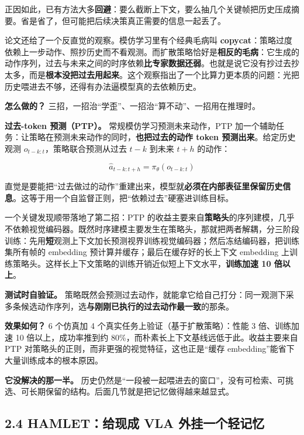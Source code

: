 \documentclass[
  chinese,
]{ctexart}
\begin{document}
正因如此，已有方法大多\textbf{回避}：要么截断上下文，要么抽几个关键帧把历史压成摘要。省是省了，但可能把后续决策真正需要的信息一起丢了。

论文还给了一个反直觉的观察。模仿学习里有个经典毛病叫
\textbf{copycat}：策略过度依赖上一步动作、照抄历史而不看观测。而扩散策略恰好是\textbf{相反的毛病}：它生成的动作序列，过去与未来之间的时序依赖\textbf{比专家数据还弱}。也就是说它没有抄过去抄太多，而是\textbf{根本没把过去用起来}。这个观察指出了一个比算力更本质的问题：光把历史喂进去不够，还得有办法逼模型真的去依赖历史。

\textbf{怎么做的？}
三招，一招治``学歪''、一招治``算不动''、一招用在推理时。

\textbf{过去-token 预测（PTP）。} 常规模仿学习预测未来动作，PTP
加一个辅助任务：让策略在预测未来动作的同时，\textbf{也把过去的动作 token
预测出来}。给定历史观测 \(o_{t-k:t}\)，策略联合预测从过去 \(t-k\) 到未来
\(t+h\) 的动作：

\[\hat{a}_{t-k:t+h} = \pi_\theta(o_{t-k:t})\]

直觉是要能把``过去做过的动作''重建出来，模型就\textbf{必须在内部表征里保留历史信息}。这等于用一个自监督正则，把``依赖过去''硬塞进训练目标。

一个关键发现顺带落地了第二招：PTP
的收益主要来自\textbf{策略头}的序列建模，几乎不依赖视觉编码器。既然时序建模主要发生在策略头，那就把两者解耦，分三阶段训练：先用\textbf{短}观测上下文加长预测视界训练视觉编码器；然后冻结编码器，把训练集所有帧的
embedding 预计算并缓存；最后在缓存好的长上下文 embedding
上训练策略头。这样长上下文策略的训练开销近似短上下文水平，\textbf{训练加速
10 倍以上}。

\textbf{测试时自验证。}
策略既然会预测过去动作，就能拿它给自己打分：同一观测下采多条候选动作序列，选\textbf{与刚刚已执行的过去动作最一致}的那条。

\textbf{效果如何？} 6 个仿真加 4 个真实任务上验证（基于扩散策略）：性能
3 倍、训练加速 10 倍以上，成功率推到约
80\%，而朴素长上下文基线远低于此。收益主要来自 PTP
对策略头的正则，而非更强的视觉特征，这也正是``缓存
embedding''能省下大量训练成本的根本原因。

\textbf{它没解决的那一半。}
历史仍然是``一段被一起喂进去的窗口''，没有可检索、可挑选、可长期保留的结构。后面几节就是把记忆做得越来越显式。

\subsection{2.4 HAMLET：给现成 VLA
外挂一个轻记忆}\label{hamletux7ed9ux73b0ux6210-vla-ux5916ux6302ux4e00ux4e2aux8f7bux8bb0ux5fc6}
\end{document}
